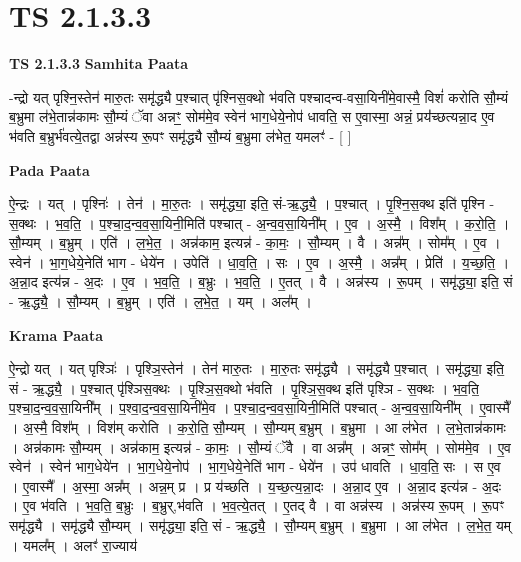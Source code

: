 \documentclass[17pt]{extarticle}
\begin{document}
\section{ TS 2.1.3.3 }

\textbf{TS 2.1.3.3 } \newline
\textbf{Samhita Paata} \newline

-न्द्रो यत् पृश्नि॒स्तेन॑ मारु॒तः समृ॑द्ध्यै प॒श्चात् पृ॑श्निस॒क्थो भ॑वति पश्चादन्व-वसा॒यिनी॑मे॒वास्मै॒ विशं॑ करोति सौ॒म्यं ब॒भ्रुमा ल॑भे॒तान्न॑कामः सौ॒म्यं ॅवा अन्नꣳ॒॒ सोम॑मे॒व स्वेन॑ भाग॒धेये॒नोप॑ धावति॒ स ए॒वास्मा॒ अन्नं॒ प्रय॑॑च्छत्यन्ना॒द ए॒व भ॑वति ब॒भ्रुर्भ॑वत्ये॒तद्वा अन्न॑स्य रू॒पꣳ समृ॑द्ध्यै सौ॒म्यं ब॒भ्रुमा ल॑भेत॒ यमलꣳ॑ - [  ] \newline

\textbf{Pada Paata} \newline

ऐ॒न्द्रः । यत् । पृश्निः॑ । तेन॑ । मा॒रु॒तः । समृ॑द्ध्या॒ इति॒ सं-ऋ॒द्ध्यै॒ । प॒श्चात् । पृ॒श्नि॒स॒क्थ इति॑ पृश्नि - स॒क्थः । भ॒व॒ति॒ । प॒श्चा॒द॒न्व॒व॒सा॒यिनी॒मिति॑ पश्चात् - अ॒न्व॒व॒सा॒यिनी᳚म् । ए॒व । अ॒स्मै॒ । विश᳚म् । क॒रो॒ति॒ । सौ॒म्यम् । ब॒भ्रुम् । एति॑ । ल॒भे॒त॒ । अन्न॑काम॒ इत्यन्न॑ - का॒मः॒ । सौ॒म्यम् । वै । अन्न᳚म् । सोम᳚म् । ए॒व । स्वेन॑ । भा॒ग॒धेये॒नेति॑ भाग - धेये॑न । उपेति॑ । धा॒व॒ति॒ । सः । ए॒व । अ॒स्मै॒ । अन्न᳚म् । प्रेति॑ । य॒च्छ॒ति॒ । अ॒न्ना॒द इत्य॑न्न - अ॒दः । ए॒व । भ॒व॒ति॒ । ब॒भ्रुः । भ॒व॒ति॒ । ए॒तत् । वै । अन्न॑स्य । रू॒पम् । समृ॑द्ध्या॒ इति॒ सं - ऋ॒द्ध्यै॒ । सौ॒म्यम् । ब॒भ्रुम् । एति॑ । ल॒भे॒त॒ । यम् । अल᳚म् ।  \newline


\textbf{Krama Paata} \newline

ऐ॒न्द्रो यत् । यत् पृश्ञिः॑ । पृश्ञि॒स्तेन॑ । तेन॑ मारु॒तः । मा॒रु॒तः समृ॑द्ध्यै । समृ॑द्ध्यै प॒श्चात् । समृ॑द्ध्या॒ इति॒ सं - ऋ॒द्ध्यै॒ । प॒श्चात् पृ॑श्ञिस॒क्थः । पृ॒श्ञि॒स॒क्थो भ॑वति । पृ॒श्ञि॒स॒क्थ इति॑ पृश्ञि - स॒क्थः । भ॒व॒ति॒ प॒श्चा॒द॒न्व॒व॒सा॒यिनी᳚म् । प॒श्वा॒द॒न्व॒व॒सा॒यिनी॑मे॒व । प॒श्चा॒द॒न्व॒व॒सा॒यिनी॒मिति॑ पश्चात् - अ॒न्व॒व॒सा॒यिनी᳚म् । ए॒वास्मै᳚ । अ॒स्मै॒ विश᳚म् । विश॑म् करोति । क॒रो॒ति॒ सौ॒म्यम् । सौ॒म्यम् ब॒भ्रुम् । ब॒भ्रुमा । आ ल॑भेत । ल॒भे॒तान्न॑कामः । अन्न॑कामः सौ॒म्यम् । अन्न॑काम॒ इत्यन्न॑ - का॒मः॒ । सौ॒म्यं ॅवै । वा अन्न᳚म् । अन्नꣳ॒॒ सोम᳚म् । सोम॑मे॒व । ए॒व स्वेन॑ । स्वेन॑ भाग॒धेये॑न । भा॒ग॒धेये॒नोप॑ । भा॒ग॒धेये॒नेति॑ भाग - धेये॑न । उप॑ धावति । धा॒व॒ति॒ सः । स ए॒व । ए॒वास्मै᳚ । अ॒स्मा॒ अन्न᳚म् । अन्न॒म् प्र । प्र य॑च्छति । य॒च्छ॒त्य॒न्ना॒दः । अ॒न्ना॒द ए॒व । अ॒न्ना॒द इत्य॑न्न - अ॒दः । ए॒व भ॑वति । भ॒व॒ति॒ ब॒भ्रुः । ब॒भ्रुर्,भ॑वति । भ॒व॒त्ये॒तत् । ए॒तद् वै । वा अन्न॑स्य । अन्न॑स्य रू॒पम् । रू॒पꣳ समृ॑द्ध्यै । समृ॑द्ध्यै सौ॒म्यम् । समृ॑द्ध्या॒ इति॒ सं - ऋ॒द्ध्यै॒ । सौ॒म्यम् ब॒भ्रुम् । ब॒भ्रुमा । आ ल॑भेत । ल॒भे॒त॒ यम् । यमल᳚म् । अलꣳ॑ रा॒ज्याय॑ \newline
\end{document}
